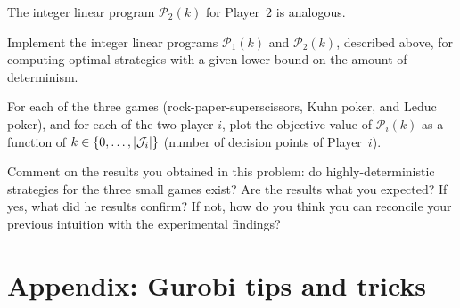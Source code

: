 \documentclass{homework}
\begin{document}
The integer linear program $\mathcal{P}_2(k)$ for Player~$2$ is analogous.

\begin{problem}[20 points]
    Implement the integer linear programs $\mathcal{P}_1(k)$ and $\mathcal{P}_2(k)$, described above, for computing optimal strategies with a given lower bound on the amount of determinism. 

    For each of the three games (rock-paper-superscissors, Kuhn poker, and Leduc poker), and for each of the two player $i$, plot the objective value of $\mathcal{P}_i(k)$ as a function of $k \in \{0, \dots, |\mathcal{J}_i|\}$ (number of decision points of Player~$i$).
\end{problem}
\begin{solution}
\end{solution}

\begin{problem}
    Comment on the results you obtained in this problem: do highly-deterministic strategies for the three small games exist? Are the results what you expected? If yes, what did he results confirm? If not, how do you think you can reconcile your previous intuition with the experimental findings?
\end{problem}
\begin{solution}
\end{solution}

\appendix
\section{Appendix: Gurobi tips and tricks}
\end{document}
